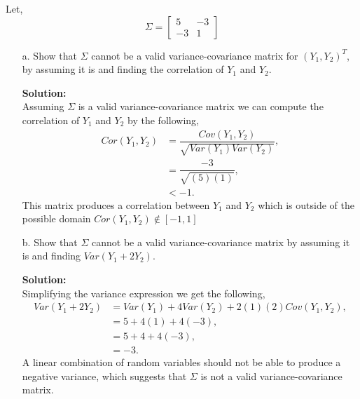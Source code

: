 \documentclass[12pt]{article}
\makeatletter
\theoremstyle{homework}
\newenvironment{exercise}[1]
{\def\@currentlabel{#1}\exercisecore}
{\endexercisecore}
\newcommand{\localhead}[1]{\par\smallskip\noindent\textbf{#1}\nobreak\\}%
\newcommand\solution{\localhead{Solution:}}
\makeatother
\begin{document}
\begin{exercise}{2} Let, 
  \begin{equation*}
    \Sigma = \begin{bmatrix}
      5 & -3\\
      -3 & 1
    \end{bmatrix}
  \end{equation*}
  \begin{enumerate}
    \item[a.] Show that $\Sigma$ cannot be a valid variance-covariance matrix for $(Y_1, Y_2)^T$,
    by assuming it is and finding the correlation of $Y_1$ and $Y_2$.\\
    \solution Assuming $\Sigma$ is a valid variance-covariance matrix we can compute the correlation of
    $Y_1$ and $Y_2$ by the following, 
    \begin{align*}
      Cor(Y_1, Y_2) &= \dfrac{Cov(Y_1, Y_2)}{\sqrt{Var(Y_1)Var(Y_2)}},\\
       &= \dfrac{-3}{\sqrt{(5)(1)}},\\
       &< -1.
    \end{align*}
    This matrix produces a correlation between $Y_1$ and $Y_2$ which is outside of the possible domain $Cor(Y_1, Y_2) \notin [-1,1]$
    \vspace{.15in}



    \item[b.] Show that $\Sigma$ cannot be a valid variance-covariance matrix by assuming it is and finding 
    $Var(Y_1 + 2Y_2)$.\\
    \solution Simplifying the variance expression we get the following,
    \begin{align*}
      Var(Y_1 + 2Y_2) &= Var(Y_1) + 4Var(Y_2) + 2(1)(2)Cov(Y_1, Y_2),\\
       &= 5 + 4(1) + 4(-3),\\
       &= 5 + 4 + 4(-3),\\
       &= -3.
    \end{align*}
    A linear combination of random variables should not be able to produce a negative variance, which suggests 
    that $\Sigma$ is not a valid variance-covariance matrix.  
  \end{enumerate}
  
\end{exercise}
\vspace{.5in}
\end{document}
